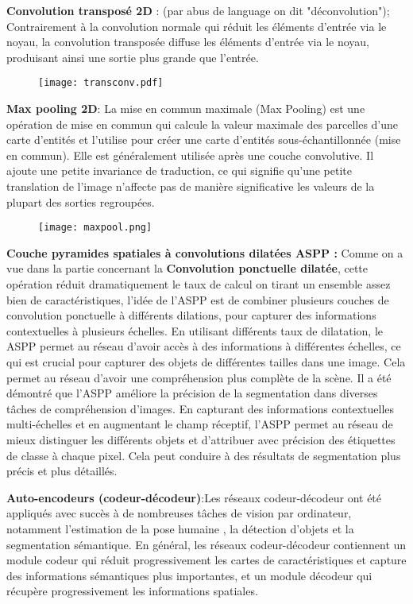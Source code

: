 \textbf{Convolution transposé 2D} : (par abus de language on dit "déconvolution"); Contrairement à la convolution normale qui réduit les éléments d'entrée via le noyau, la convolution transposée diffuse les éléments d'entrée via le noyau, produisant ainsi une sortie plus grande que l'entrée. 
\begin{figure}[hbt!]
  \centering
  \texttt{[image: transconv.pdf]}
\end{figure}

\textbf{Max pooling 2D}: La mise en commun maximale (Max Pooling) est une opération de mise en commun qui calcule la valeur maximale des parcelles d'une carte d'entités et l'utilise pour créer une carte d'entités sous-échantillonnée (mise en commun). Elle est généralement utilisée après une couche convolutive. Il ajoute une petite invariance de traduction, ce qui signifie qu'une petite translation de l'image n'affecte pas de manière significative les valeurs de la plupart des sorties regroupées.
\begin{figure}[hbt!]
  \centering
  \texttt{[image: maxpool.png]}
\end{figure}


\textbf{Couche pyramides spatiales à convolutions dilatées ASPP :} Comme on a vue dans la partie concernant la \textbf{Convolution ponctuelle dilatée}, cette opération réduit dramatiquement le taux de calcul on tirant un ensemble assez bien de caractéristiques, l'idée de l'ASPP est de combiner plusieurs couches de convolution ponctuelle à différents dilations, pour capturer des informations contextuelles à plusieurs échelles. En utilisant différents taux de dilatation, le ASPP permet au réseau d'avoir accès à des informations à différentes échelles, ce qui est crucial pour capturer des objets de différentes tailles dans une image. Cela permet au réseau d'avoir une compréhension plus complète de la scène. Il a été démontré que l'ASPP améliore la précision de la segmentation dans diverses tâches de compréhension d'images. En capturant des informations contextuelles multi-échelles et en augmentant le champ réceptif, l'ASPP permet au réseau de mieux distinguer les différents objets et d'attribuer avec précision des étiquettes de classe à chaque pixel. Cela peut conduire à des résultats de segmentation plus précis et plus détaillés. \cite{48}

\textbf{Auto-encodeurs (codeur-décodeur)}:Les réseaux codeur-décodeur ont été appliqués avec succès à de nombreuses tâches de vision par ordinateur, notamment l'estimation de la pose humaine \cite{52}, la détection d'objets et la segmentation sémantique. En général, les réseaux codeur-décodeur contiennent un module codeur qui réduit progressivement les cartes de caractéristiques et capture des informations sémantiques plus importantes, et un module décodeur qui récupère progressivement les informations spatiales. 

